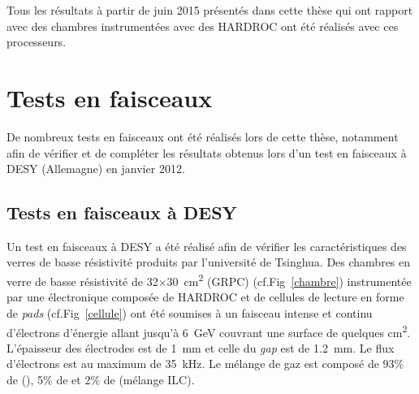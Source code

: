 \vspace*{-0.8cm}
 Tous les résultats à partir de juin \num{2015} présentés dans cette thèse qui ont rapport avec des chambres instrumentées avec des HARDROC ont été réalisés avec ces processeurs.
\vspace*{-0.3cm}
\section{Tests en faisceaux}
\vspace*{-0.3cm}
De nombreux tests en faisceaux ont été réalisés lors de cette thèse, notamment afin de vérifier et de compléter les résultats obtenus lors d'un test en faisceaux à DESY (Allemagne) en janvier \num{2012}.
\vspace*{-0.25cm}
\subsection{Tests en faisceaux à DESY}
\label{DESYY}
\vspace*{-0.25cm}
Un test en faisceaux à DESY \cite{Haddad:2012fx} a été réalisé afin de vérifier les caractéristiques des verres de basse résistivité produits par l'université de Tsinghua. Des chambres en verre de basse résistivité de \num{32}$\times$\SI{30}{\square\centi\meter} (GRPC) (cf.Fig~\ref{chambre}) instrumentée par une électronique composée de HARDROC et de cellules de lecture en forme de \textit{pads} (cf.Fig~\ref{cellule}) ont été soumises à un faisceau intense et continu d'électrons d'énergie allant jusqu'à \SI{6}{\giga\eV} couvrant une surface de quelques \si{\square\centi\meter}. L'épaisseur des électrodes est de \SI{1}{\milli\meter} et celle du \textit{gap} est de \SI{1.2}{\milli\meter}. Le flux d'électrons est au maximum de \SI{35}{\kilo\hertz}. Le mélange de gaz est composé de \num{93}\% de (), \num{5}\% de  et \num{2}\% de  (mélange ILC).

